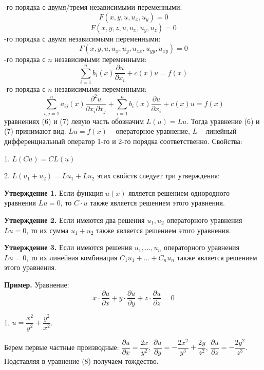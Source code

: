 \documentclass[9pt]{article}
\begin{document}
-го порядка с двумя/тремя независимыми переменными:
\begin{equation}
    F(x,y,u,u_x,u_y)=0
\end{equation}
\begin{equation}
    F(x,y,z,u,u_x,u_y,u_z)=0
\end{equation}
-го порядка с двумя независимыми переменными:
\begin{equation}
    F(x,y,u,u_x,u_y,u_{xx},u_{yy},u_{xy})=0
\end{equation}
-го порядка с \(n\) независимыми переменными:
\begin{equation}
    \sum^n_{i=1}b_i(x)\dfrac{\partial u}{\partial x_i}+c(x)u=f(x)
\end{equation}
-го порядка с \(n\) независимыми переменными:
\begin{equation}
    \sum^n_{i,j=1}a_{ij}(x)\dfrac{\partial^2 u}{\partial x_i \partial x_j}+\sum^n_{i=1}b_i(x)\dfrac{\partial u}{\partial x_i}+c(x)u=f(x)
\end{equation}
 уравнениях (6) и (7) левую часть обозначим \(L(u)=Lu\). Тогда уравнение (6) и (7) принимают вид: \(Lu=f(x)\) -- операторное уравнение, \(L\) -- линейный дифференциальный оператор 1-го и 2-го порядка соответственно. Свойства:
\par1. \(L(Cu)=CL(u)\)
\par2. \(L(u_1+u_2)=Lu_1+Lu_2\)
 этих свойств следует три утверждения:
\par\textbf{Утверждение 1.} Если функция \(u(x)\) является решением однородного уравнения \(Lu=0\), то \(C\cdot u\) также является решением этого уравнения.
\par\textbf{Утверждение 2.} Если имеются два решения \(u_1,u_2\) операторного уравнения \(Lu=0\), то их сумма \(u_1+u_2\) также является решением этого уравнения.
\par\textbf{Утверждение 3.} Если имеются решения \(u_1,...,u_n\) операторного уравнения \(Lu=0\), то их линейная комбинация \(C_1u_1+...+C_nu_n\) также является решением этого уравнения.
\par\textbf{Пример.} Уравнение:
\begin{equation}
    x\cdot \dfrac{\partial u}{\partial x}+y\cdot \dfrac{\partial u}{\partial y}+z\cdot \dfrac{\partial u}{\partial z}=0
\end{equation}
\par1. \(u=\dfrac{x^2}{y^2}+\dfrac{y^2}{x^2}\).
\par Берем первые частные производные: \(\dfrac{\partial u}{\partial x} = \dfrac{2x}{y^2}\), \(\dfrac{\partial u}{\partial y} = -\dfrac{2x^2}{y^3}+\dfrac{2y}{z^2}\), \(\dfrac{\partial u}{\partial z} = -\dfrac{2y^2}{z^3}\). Подставляя в уравнение (8) получаем тождество.
\end{document}
